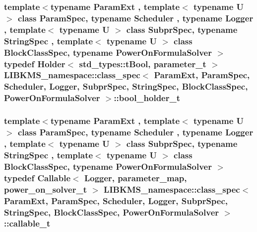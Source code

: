 \hypertarget{structLIBKMS__namespace_1_1class__spec_a11f37b67e2050edaa156b7af6c0d1db7}{
\subsubsection[{bool\-\_\-holder\-\_\-t}]{\setlength{\rightskip}{0pt plus 5cm}template$<$typename Param\-Ext , template$<$ typename U $>$ class Param\-Spec, typename Scheduler , typename Logger , template$<$ typename U $>$ class Subpr\-Spec, typename String\-Spec , template$<$ typename U $>$ class Block\-Class\-Spec, typename Power\-On\-Formula\-Solver $>$ typedef {\bf Holder}$<$ std\-\_\-types\-::t\-Bool, {\bf parameter\-\_\-t} $>$ {\bf L\-I\-B\-K\-M\-S\-\_\-namespace\-::class\-\_\-spec}$<$ Param\-Ext, Param\-Spec, Scheduler, Logger, Subpr\-Spec, String\-Spec, Block\-Class\-Spec, Power\-On\-Formula\-Solver $>$\-::{\bf bool\-\_\-holder\-\_\-t}}}\label{structLIBKMS__namespace_1_1class__spec_a11f37b67e2050edaa156b7af6c0d1db7}
\hypertarget{structLIBKMS__namespace_1_1class__spec_a1825fec3cf7f751c18fa6c89e9068d42}{
\subsubsection[{callable\-\_\-t}]{\setlength{\rightskip}{0pt plus 5cm}template$<$typename Param\-Ext , template$<$ typename U $>$ class Param\-Spec, typename Scheduler , typename Logger , template$<$ typename U $>$ class Subpr\-Spec, typename String\-Spec , template$<$ typename U $>$ class Block\-Class\-Spec, typename Power\-On\-Formula\-Solver $>$ typedef {\bf Callable}$<$ Logger, {\bf parameter\-\_\-map}, {\bf power\-\_\-on\-\_\-solver\-\_\-t} $>$ {\bf L\-I\-B\-K\-M\-S\-\_\-namespace\-::class\-\_\-spec}$<$ Param\-Ext, Param\-Spec, Scheduler, Logger, Subpr\-Spec, String\-Spec, Block\-Class\-Spec, Power\-On\-Formula\-Solver $>$\-::{\bf callable\-\_\-t}}}\label{structLIBKMS__namespace_1_1class__spec_a1825fec3cf7f751c18fa6c89e9068d42}

